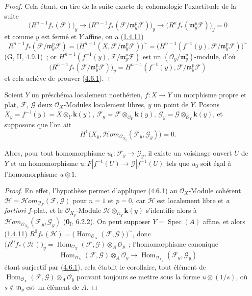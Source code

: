 \begin{proof}
Cela étant, on tire de la suite exacte de cohomologie l'exactitude de la
suite
\[
\bigl(R^{n-1}f_*(\mathcal F)\bigr)_y
\longrightarrow
\bigl(R^{n-1}f_*(\mathcal F/\mathfrak m_y^p\mathcal F)\bigr)_y
\longrightarrow
\bigl(R^nf_*(\mathfrak m_y^p\mathcal F)\bigr)_y=0
\]
et comme $y$ est fermé et $Y$ affine, on a (\hyperref[III.1.4.11-fr]{1.4.11})
\[
R^{n-1}f_*(\mathcal F/\mathfrak m_y^p\mathcal F)
=\bigl(H^{n-1}(X,\mathcal F/\mathfrak m_y^p\mathcal F)\bigr)^\sim
=\bigl(H^{n-1}(f^{-1}(y),
\mathcal F/\mathfrak m_y^p\mathcal F)\bigr)^\sim
\]
(G, II, 4.9.1)~; or
$H^{n-1}(f^{-1}(y),\mathcal F/\mathfrak m_y^p\mathcal F)$ est un
$(\mathcal O_y/\mathfrak m_y^p)$-module, d'où
\[
\bigl(R^{n-1}f_*(\mathcal F/\mathfrak m_y^p\mathcal F)\bigr)_y
=H^{n-1}(f^{-1}(y),\mathcal F/\mathfrak m_y^p\mathcal F)
\]
et cela achève de prouver (\hyperref[III.4.6.1-fr]{4.6.1}).
\end{proof}

\begin{corollary}[4.6.2]
\label{III.4.6.2-fr}
Soient $Y$ un préschéma localement noethérien, $f:X\to Y$ un morphisme propre
et plat, $\mathcal F$, $\mathcal G$ deux $\mathcal O_X$-Modules localement
libres, $y$ un point de $Y$. Posons
$X_y=f^{-1}(y)=X\otimes_Y\boldsymbol{k}(y)$,
$\mathcal F_y=\mathcal F\otimes_{\mathcal O_Y}\boldsymbol{k}(y)$,
$\mathcal G_y=\mathcal G\otimes_{\mathcal O_Y}\boldsymbol{k}(y)$,
et supposons que l'on ait
\[
\label{III.4.6.2.1-fr}
H^1\bigl(X_y,
\mathcal{H}\!om_{\mathcal O_{X_y}}(\mathcal F_y,\mathcal G_y)\bigr)=0.
\tag{4.6.2.1}
\]

Alors, pour tout homomorphisme $u_0:\mathcal F_y\to\mathcal G_y$, il existe
un voisinage ouvert $U$ de $Y$ et un homomorphisme
$u:F|f^{-1}(U)\longrightarrow\mathcal G|f^{-1}(U)$
tels que $u_0$ soit égal à l'homomorphisme $u\otimes1$.
\end{corollary}

\begin{proof}
En effet, l'hypothèse permet d'appliquer (\hyperref[III.4.6.1-fr]{4.6.1}) au
$\mathcal O_X$-Module cohérent
$\mathcal H=\mathcal{H}\!om_{\mathcal O_X}(\mathcal F,\mathcal G)$ pour
$n=1$ et $p=0$, car $\mathcal H$ est localement libre et \emph{a fortiori}
$f$-plat, et le $\mathcal O_{X_y}$-Module
$\mathcal H\otimes_{\mathcal O_Y}\boldsymbol{k}(y)$ s'identifie alors à
$\mathcal{H}\!om_{\mathcal O_{X_y}}(\mathcal F_y,\mathcal G_y)$
(\textbf{0}\textsubscript{I}, 6.2.2). On peut supposer $Y=\operatorname{Spec}(A)$
affine, et alors (\hyperref[III.1.4.11-fr]{1.4.11})
$R^0f_*(\mathcal H)=
\bigl(\operatorname{Hom}_{\mathcal O_X}(\mathcal F,\mathcal G)\bigr)^\sim$,
donc
$\bigl(R^0f_*(\mathcal H)\bigr)_y
=\operatorname{Hom}_{\mathcal O_X}(\mathcal F,\mathcal G)
\otimes_A\mathcal O_y$~;
l'homomorphisme canonique
\[
\operatorname{Hom}_{\mathcal O_X}(\mathcal F,\mathcal G)
\otimes_A\mathcal O_y
\longrightarrow
\operatorname{Hom}_{\mathcal O_{X_y}}(\mathcal F_y,\mathcal G_y)
\]
étant surjectif par (\hyperref[III.4.6.1-fr]{4.6.1}), cela établit le
corollaire, tout élément de
$\operatorname{Hom}_{\mathcal O_X}(\mathcal F,\mathcal G)
\otimes_A\mathcal O_y$ pouvant toujours se mettre sous la forme
$u\otimes(1/s)$, où $s\notin\mathfrak m_y$ est un élément de $A$.
\end{proof}

